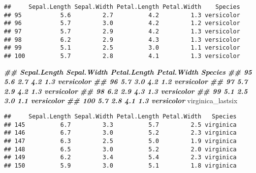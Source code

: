 \documentclass[
]{article}
\newenvironment{Shaded}{\begin{snugshade}}{\end{snugshade}}
\newcommand{\DocumentationTok}[1]{\textcolor[rgb]{0.56,0.35,0.01}{\textbf{\textit{#1}}}}
\newcommand{\NormalTok}[1]{#1}
\begin{document}
\begin{verbatim}
##     Sepal.Length Sepal.Width Petal.Length Petal.Width    Species
## 95           5.6         2.7          4.2         1.3 versicolor
## 96           5.7         3.0          4.2         1.2 versicolor
## 97           5.7         2.9          4.2         1.3 versicolor
## 98           6.2         2.9          4.3         1.3 versicolor
## 99           5.1         2.5          3.0         1.1 versicolor
## 100          5.7         2.8          4.1         1.3 versicolor
\end{verbatim}

\begin{Shaded}
\begin{Highlighting}[]
\DocumentationTok{\#\# Sepal.Length Sepal.Width Petal.Length Petal.Width Species}
\DocumentationTok{\#\# 95 5.6 2.7 4.2 1.3 versicolor}
\DocumentationTok{\#\# 96 5.7 3.0 4.2 1.2 versicolor}
\DocumentationTok{\#\# 97 5.7 2.9 4.2 1.3 versicolor}
\DocumentationTok{\#\# 98 6.2 2.9 4.3 1.3 versicolor}
\DocumentationTok{\#\# 99 5.1 2.5 3.0 1.1 versicolor}
\DocumentationTok{\#\# 100 5.7 2.8 4.1 1.3 versicolor}
\NormalTok{virginica\_lastsix}
\end{Highlighting}
\end{Shaded}

\begin{verbatim}
##     Sepal.Length Sepal.Width Petal.Length Petal.Width   Species
## 145          6.7         3.3          5.7         2.5 virginica
## 146          6.7         3.0          5.2         2.3 virginica
## 147          6.3         2.5          5.0         1.9 virginica
## 148          6.5         3.0          5.2         2.0 virginica
## 149          6.2         3.4          5.4         2.3 virginica
## 150          5.9         3.0          5.1         1.8 virginica
\end{verbatim}
\end{document}

